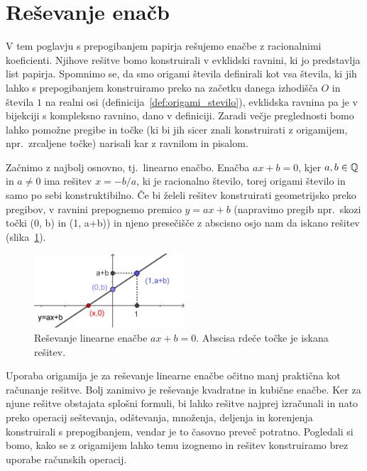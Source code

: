 \section{Reševanje enačb}
\label{pogl:enacbe}

V tem poglavju s prepogibanjem papirja rešujemo enačbe z racionalnimi koeficienti. Njihove rešitve bomo konstruirali v evklidski ravnini, ki jo predstavlja list papirja. Spomnimo se, da smo origami števila definirali kot vsa števila, ki jih lahko s prepogibanjem konstruiramo preko na začetku danega izhodišča $O$ in števila $1$ na realni osi (definicija~\ref{def:origami_stevilo}), evklidska ravnina pa je v bijekciji s kompleksno ravnino, dano v definiciji. Zaradi večje preglednosti bomo lahko pomožne pregibe in točke (ki bi jih sicer znali konstruirati z origamijem, npr.\ zrcaljene točke) narisali kar z ravnilom in pisalom.

Začnimo z najbolj osnovno, tj.\ linearno enačbo. Enačba $ax + b = 0$, kjer $a, b \in \mathbb Q$ in $a \neq 0$ ima rešitev $x = -b/a$, ki je racionalno število, torej origami število in samo po sebi konstruktibilno. Če bi želeli rešitev konstruirati geometrijsko preko pregibov, v ravnini prepognemo premico $y = ax + b$ (napravimo pregib npr.\ skozi točki (0, b) in (1, a+b)) in njeno presečišče z abscisno osjo nam da iskano rešitev (slika~\ref{fig:lin_en}).

\begin{figure}[h]
    \centering
    \includegraphics[width=0.5\textwidth]{images/linearna_enacba.png}
    \caption[Reševanje linearne enačbe]{Reševanje linearne enačbe $ax+b=0$. Abscisa rdeče točke je iskana rešitev.}
    \label{fig:lin_en}
\end{figure}

Uporaba origamija je za reševanje linearne enačbe očitno manj praktična kot računanje rešitve. Bolj zanimivo je reševanje kvadratne in kubične enačbe. Ker za njune rešitve obstajata splošni formuli, bi lahko rešitve najprej izračunali in nato preko operacij seštevanja, odštevanja, množenja, deljenja in korenjenja konstruirali s prepogibanjem, vendar je to časovno preveč potratno. Pogledali si bomo, kako se z origamijem lahko temu izognemo in rešitev konstruiramo brez uporabe računskih operacij.

